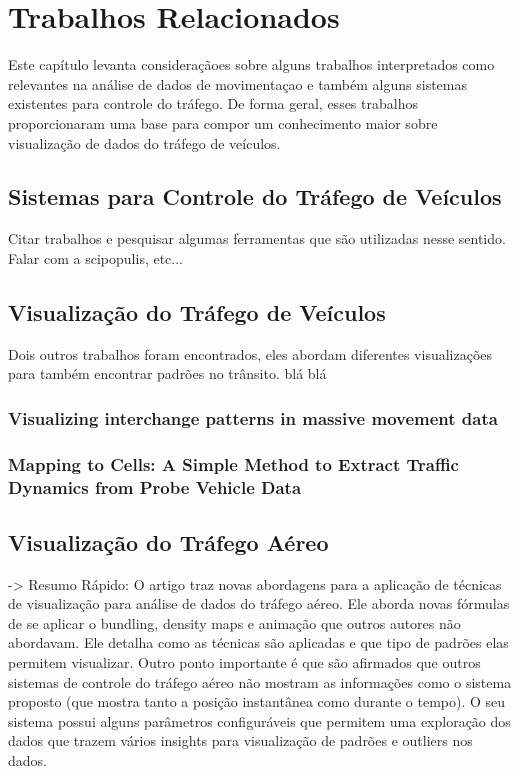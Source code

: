 \chapter{Trabalhos Relacionados}
\label{cap:trabalhos-relacionados}

Este capítulo levanta consideraçãoes sobre alguns trabalhos interpretados como
relevantes na análise de dados de movimentaçao e também alguns sistemas existentes
para controle do tráfego. De forma geral, esses trabalhos proporcionaram uma base
para compor um conhecimento maior sobre visualização de dados do tráfego de veículos.

\section{Sistemas para Controle do Tráfego de Veículos}

Citar trabalhos e pesquisar algumas ferramentas que são utilizadas nesse sentido.
Falar com a scipopulis, etc... 

\section{Visualização do Tráfego de Veículos}

Dois outros trabalhos foram encontrados, eles abordam diferentes visualizações
para também encontrar padrões no trânsito. blá blá

\subsection{Visualizing interchange patterns in massive movement data}

\subsection{Mapping to Cells: A Simple Method to Extract Traffic Dynamics from Probe Vehicle Data}

\section{Visualização do Tráfego Aéreo}

-> Resumo Rápido: O artigo traz novas abordagens para a aplicação de técnicas de visualização
para análise de dados do tráfego aéreo. Ele aborda novas fórmulas de se aplicar o bundling,
density maps e animação que outros autores não abordavam. Ele detalha como as técnicas
são aplicadas e que tipo de padrões elas permitem visualizar. Outro ponto importante é
que são afirmados que outros sistemas de controle do tráfego aéreo não mostram as informações
como o sistema proposto (que mostra tanto a posição instantânea como durante o tempo). O seu sistema
possui alguns parâmetros configuráveis que permitem uma exploração dos dados que
trazem vários insights para visualização de padrões e outliers nos dados.

